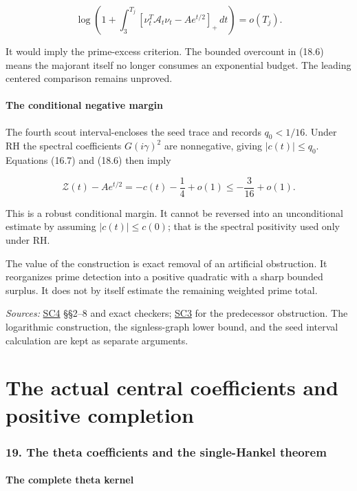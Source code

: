 \documentclass[
  10pt,
  a4paper,
  10pt,
  oneside,
  openany]{book}
\begin{document}
\[
\log\left(1+\int_3^{T_j}
[\nu_t^T\mathcal A_t\nu_t-Ae^{t/2}]_+\,dt\right)=o(T_j).
\tag{18.12}\label{eq:18.12}
\]

It would imply the prime-excess criterion. The bounded overcount in
(18.6) means the majorant itself no longer consumes an exponential
budget. The leading centered comparison remains unproved.

\subsection{The conditional negative
margin}\label{the-conditional-negative-margin}

The fourth scout interval-encloses the seed trace and records
\(q_0<1/16\). Under RH the spectral coefficients \(G(i\gamma)^2\) are
nonnegative, giving \(|c(t)|\le q_0\). Equations (16.7) and (18.6) then
imply

\[
\mathcal Z(t)-Ae^{t/2}=-c(t)-\frac14+o(1)
\le-\frac3{16}+o(1).
\tag{18.13}\label{eq:18.13}
\]

This is a robust conditional margin. It cannot be reversed into an
unconditional estimate by assuming \(|c(t)|\le c(0)\); that is the
spectral positivity used only under RH.

The value of the construction is exact removal of an artificial
obstruction. It reorganizes prime detection into a positive quadratic
with a sharp bounded surplus. It does not by itself estimate the
remaining weighted prime total.

\emph{Sources:} \hyperref[source-sc4]{SC4} §§2--8 and exact checkers;
\hyperref[source-sc3]{SC3} for the predecessor obstruction. The
logarithmic construction, the signless-graph lower bound, and the seed
interval calculation are kept as separate arguments.

\part{The actual central coefficients and positive completion}

\section{19. The theta coefficients and the single-Hankel
theorem}\label{ch-hankel}

\subsection{The complete theta kernel}\label{the-complete-theta-kernel}
\end{document}
